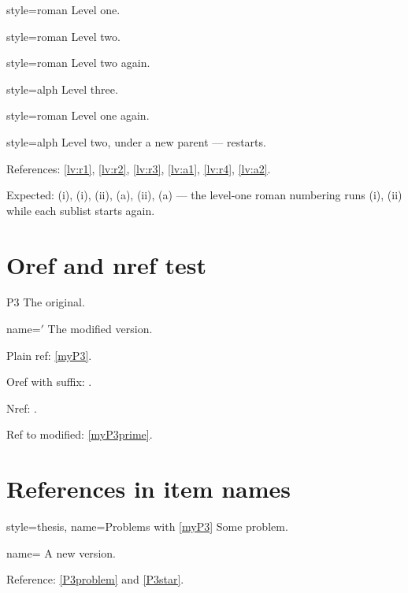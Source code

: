 \documentclass[leqno]{article}
\begin{document}
\begin{prop}
  \item[style=roman] Level one. \label{lv:r1}
  \begin{prop}
    \item[style=roman] Level two. \label{lv:r2}
    \item[style=roman] Level two again. \label{lv:r3}
    \begin{prop}
      \item[style=alph] Level three. \label{lv:a1}
    \end{prop}
  \end{prop}
  \item[style=roman] Level one again. \label{lv:r4}
  \begin{prop}
    \item[style=alph] Level two, under a new parent --- restarts. \label{lv:a2}
  \end{prop}
\end{prop}

References: \ref{lv:r1}, \ref{lv:r2}, \ref{lv:r3}, \ref{lv:a1},
\ref{lv:r4}, \ref{lv:a2}.

Expected: (i), (i), (ii), (a), (ii), (a) --- the level-one roman numbering runs
(i), (ii) while each sublist starts again.

\section{Oref and nref test}

\begin{prop}
  \item[P3] The original. \label{myP3}
  \item[name={\nref{myP3}$'$}] The modified version. \label{myP3prime}
\end{prop}

Plain ref: \ref{myP3}.

Oref with suffix: .

Nref: .

Ref to modified: \ref{myP3prime}.

\section{References in item names}
\begin{prop}
    \item[style=thesis, name={Problems with \ref{myP3}}]
    Some problem. \label{P3problem}
    \item[name={\oref[*]{myP3}}]
    A new version. \label{P3star}
\end{prop}
Reference: \ref{P3problem} and \ref{P3star}.
\end{document}
